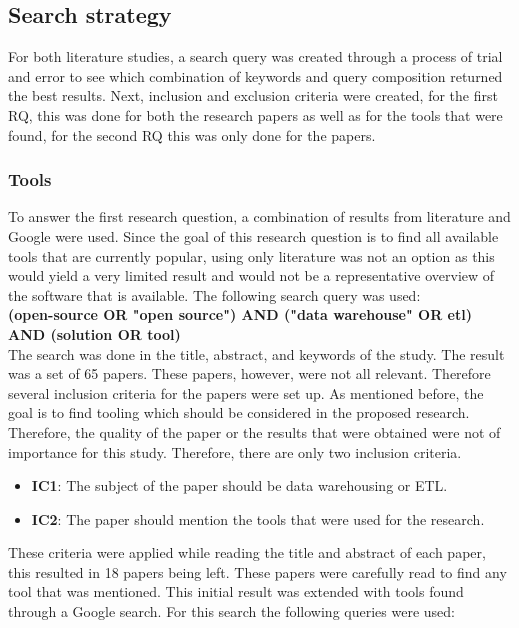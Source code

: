 \documentclass[11pt]{article}
\begin{document}
\subsection{Search strategy}
\label{searchstrat}
For both literature studies, a search query was created through a process of trial and error to see which combination of keywords and query composition returned the best results. Next, inclusion and exclusion criteria were created, for the first RQ, this was done for both the research papers as well as for the tools that were found, for the second RQ this was only done for the papers. \\

\subsubsection{Tools}
\label{searchstrat:tools}
To answer the first research question, a combination of results from literature and Google were used. Since the goal of this research question is to find all available tools that are currently popular, using only literature was not an option as this would yield a very limited result and would not be a representative overview of the software that is available. The following search query was used: \\

\textbf{(open-source OR "open source") AND ("data warehouse" OR etl) AND (solution OR tool)}\\

The search was done in the title, abstract, and keywords of the study. The result was a set of 65 papers. These papers, however, were not all relevant. Therefore several inclusion criteria for the papers were set up. As mentioned before, the goal is to find tooling which should be considered in the proposed research. Therefore, the quality of the paper or the results that were obtained were not of importance for this study. Therefore, there are only two inclusion criteria.

\begin{itemize}
    \item \textbf{IC1}: The subject of the paper should be data warehousing or ETL.
    \item \textbf{IC2}: The paper should mention the tools that were used for the research.
\end{itemize}

These criteria were applied while reading the title and abstract of each paper, this resulted in 18 papers being left. These papers were carefully read to find any tool that was mentioned. This initial result was extended with tools found through a Google search. For this search the following queries were used:
\end{document}
